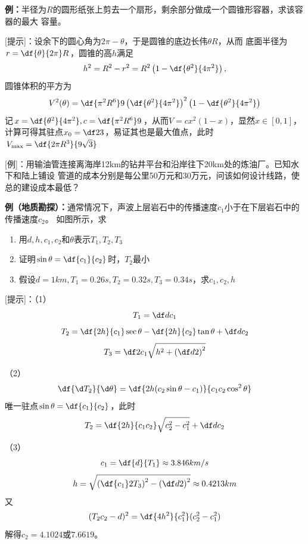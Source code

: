 {\bf 例：}半径为$R$的圆形纸张上剪去一个扇形，剩余部分做成一个圆锥形容器，求该容器的最大
容量。

[提示]：设余下的圆心角为$2\pi-\theta$，于是圆锥的底边长伟$\theta R$，从而
底面半径为$r=\df{\theta}{2\pi}R$，圆锥的高$h$满足
$$h^2=R^2-r^2=R^2\left(1-\df{\theta^2}{4\pi^2}\right),$$
圆锥体积的平方为
$$V^2(\theta)=\df{\pi^2R^6}9\left(\df{\theta^2}{4\pi^2}\right)^2
\left(1-\df{\theta^2}{4\pi^2}\right)$$
记$x=\df{\theta^2}{4\pi^2},c=\df{\pi^2R^6}9$，从而$V=cx^2(1-x)$，显然$x\in[0,1]$，
计算可得其驻点$x_0=\df23$，易证其也是最大值点，此时$V_{\max}=\df{2\pi R^3}{9\sqrt3}$

[例]：用输油管连接离海岸12km的钻井平台和沿岸往下20km处的炼油厂。已知水下和陆上铺设
管道的成本分别是每公里50万元和30万元，问该如何设计线路，使总的建设成本最低？

{\bf 例（地质勘探）：}通常情况下，声波上层岩石中的传播速度$c_1$小于在下层岩石中的传播速度$c_2$。
如图所示，求
\begin{enumerate}[(1)]
  \setlength{\itemindent}{1cm}
  \item 用$d,h,c_1,c_2$和$\theta$表示$T_1,T_2,T_3$
  \item 证明$\sin\theta=\df{c_1}{c_2}$时，$T_2$最小
  \item 假设$d=1km,T_1=0.26s,T_2=0.32s,T_3=0.34s$，求$c_1,c_2,h$
\end{enumerate}
\begin{center}
\end{center}

[提示]：（1）
$$T_1=\df d{c_1}$$
$$T_2=\df{2h}{c_1}\sec\theta-\df{2h}{c_2}\tan\theta+\df d{c_2}$$
$$T_3=\df2{c_1}\sqrt{h^2+\left(\df d2\right)^2}$$


（2）
$$\df{\d T_2}{\d\theta}=\df{2h(c_2\sin\theta-c_1)}{c_1c_2\cos^2\theta}$$
唯一驻点$\sin\theta=\df{c_1}{c_2}$，此时
$$T_2=\df{2h}{c_1c_2}\sqrt{c_2^2-c_1^2}+\df d{c_2}$$

（3）
$$c_1=\df{d}{T_1}\approx3.846km/s$$
$$h=\sqrt{\left(\df{c_1}2T_3\right)^2-\left(\df d2\right)^2}\approx0.4213km$$
又
$$(T_2c_2-d)^2=\df{4h^2}{c_1^2}(c_2^2-c_1^2)$$
解得$c_2=4.1024$或$7.6619$。

